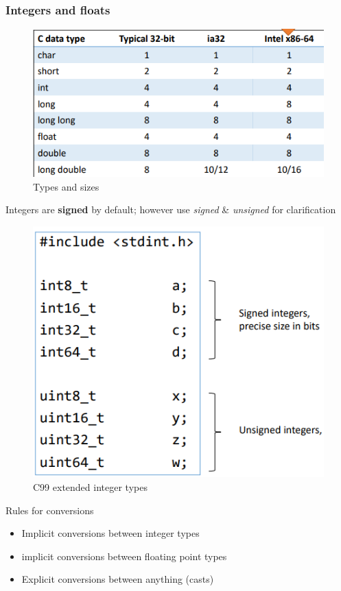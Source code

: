 \documentclass[a4paper,10pt]{article}
\begin{document}
\subsubsection{Integers and floats}
\begin{figure}[htp]
    \centering
    \includegraphics[width=1\linewidth]{Pictures/e10.png}
    \caption{Types and sizes}
\end{figure}
\begin{tipbox}
    {}
    Integers are \textbf{signed} by default; however use \textit{signed} \& \textit{unsigned} for clarification
\end{tipbox}
\begin{figure}[h]
        \centering
        \includegraphics[width=0.7\linewidth]{Pictures/e11.png}
        \caption{C99 extended integer types}
    \end{figure}
\pagebreak
\begin{tbox}
    {Rules for conversions}
    \begin{itemize}
        \item Implicit conversions between integer types
        \item implicit conversions between floating point types
        \item Explicit conversions between anything (casts)
    \end{itemize}
\end{tbox}
\end{document}
